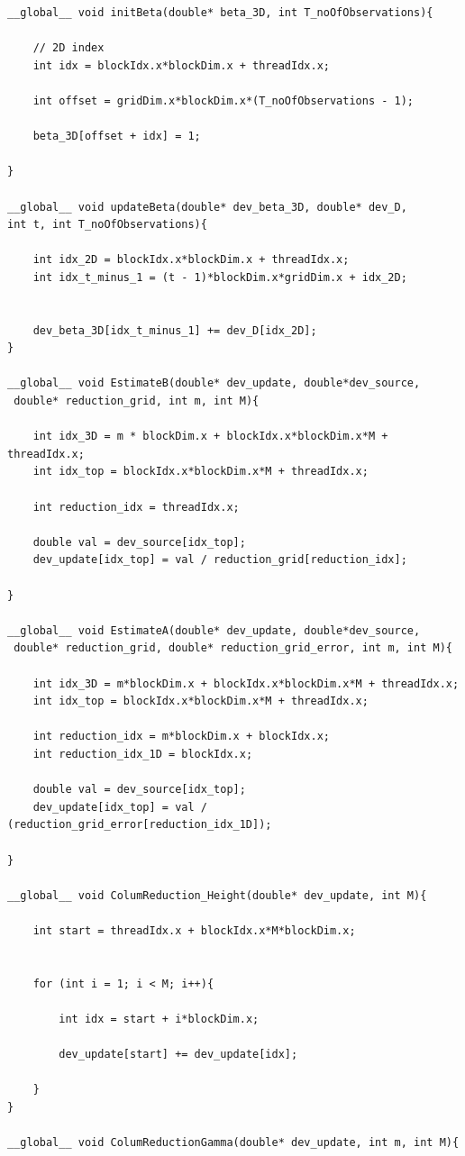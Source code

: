 \documentclass[english, paper=a4]{scrartcl}
\begin{document}
\begin{verbatim}
__global__ void initBeta(double* beta_3D, int T_noOfObservations){

	// 2D index
	int idx = blockIdx.x*blockDim.x + threadIdx.x;

	int offset = gridDim.x*blockDim.x*(T_noOfObservations - 1);

	beta_3D[offset + idx] = 1;

}

__global__ void updateBeta(double* dev_beta_3D, double* dev_D, 
int t, int T_noOfObservations){

	int idx_2D = blockIdx.x*blockDim.x + threadIdx.x;
	int idx_t_minus_1 = (t - 1)*blockDim.x*gridDim.x + idx_2D;


	dev_beta_3D[idx_t_minus_1] += dev_D[idx_2D];
}

__global__ void EstimateB(double* dev_update, double*dev_source,
 double* reduction_grid, int m, int M){

	int idx_3D = m * blockDim.x + blockIdx.x*blockDim.x*M + threadIdx.x;
	int idx_top = blockIdx.x*blockDim.x*M + threadIdx.x;

	int reduction_idx = threadIdx.x;

	double val = dev_source[idx_top];
	dev_update[idx_top] = val / reduction_grid[reduction_idx];

}

__global__ void EstimateA(double* dev_update, double*dev_source,
 double* reduction_grid, double* reduction_grid_error, int m, int M){

	int idx_3D = m*blockDim.x + blockIdx.x*blockDim.x*M + threadIdx.x;
	int idx_top = blockIdx.x*blockDim.x*M + threadIdx.x;

	int reduction_idx = m*blockDim.x + blockIdx.x;
	int reduction_idx_1D = blockIdx.x;

	double val = dev_source[idx_top];
	dev_update[idx_top] = val / (reduction_grid_error[reduction_idx_1D]);

}

__global__ void ColumReduction_Height(double* dev_update, int M){

	int start = threadIdx.x + blockIdx.x*M*blockDim.x;


	for (int i = 1; i < M; i++){

		int idx = start + i*blockDim.x;

		dev_update[start] += dev_update[idx];

	}
}

__global__ void ColumReductionGamma(double* dev_update, int m, int M){


\end{verbatim}
\end{document}
